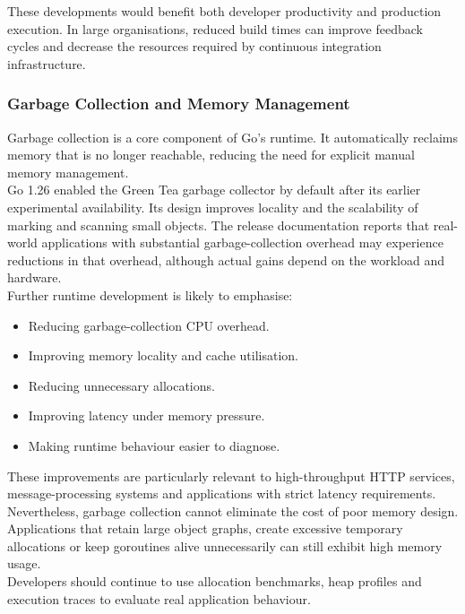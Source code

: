 These developments would benefit both developer productivity and production execution. In large organisations, reduced build times can improve feedback cycles and decrease the resources required by continuous integration infrastructure.

\subsubsection{Garbage Collection and Memory Management}

Garbage collection is a core component of Go's runtime. It automatically reclaims memory that is no longer reachable, reducing the need for explicit manual memory management.\\

Go 1.26 enabled the Green Tea garbage collector by default after its earlier experimental availability. Its design improves locality and the scalability of marking and scanning small objects. The release documentation reports that real-world applications with substantial garbage-collection overhead may experience reductions in that overhead, although actual gains depend on the workload and hardware.\\

Further runtime development is likely to emphasise:

\begin{itemize}
    \item Reducing garbage-collection CPU overhead.
    \item Improving memory locality and cache utilisation.
    \item Reducing unnecessary allocations.
    \item Improving latency under memory pressure.
    \item Making runtime behaviour easier to diagnose.
\end{itemize}

These improvements are particularly relevant to high-throughput HTTP services, message-processing systems and applications with strict latency requirements.\\

Nevertheless, garbage collection cannot eliminate the cost of poor memory design. Applications that retain large object graphs, create excessive temporary allocations or keep goroutines alive unnecessarily can still exhibit high memory usage.\\

Developers should continue to use allocation benchmarks, heap profiles and execution traces to evaluate real application behaviour.

